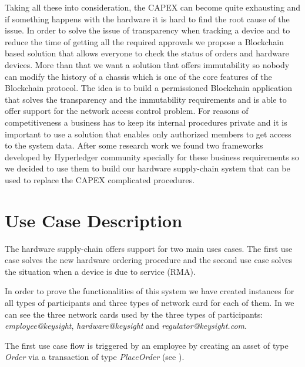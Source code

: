 Taking all these into consideration, the CAPEX can become quite exhausting and if something happens with the hardware it is hard to find the root cause of the issue. In order to solve the issue of transparency when tracking a device and to reduce the time of getting all the required approvals we propose a Blockchain based solution that allows everyone to check the status of orders and hardware devices. More than that we want a solution that offers immutability so nobody can modify the history of a chassis which is one of the core features of the Blockchain protocol.
The idea is to build a permissioned Blockchain application that solves the transparency and the immutability requirements and is able to offer support for the network access control problem.
For reasons of competitiveness a business has to keep its internal procedures private and it is important to use a solution that enables only authorized members to get access to the system data.
After some research work we found two frameworks developed by Hyperledger community specially for these business requirements so we decided to use them to build our hardware supply-chain system that can be used to replace the CAPEX complicated procedures.

\section{Use Case Description}
\label{sub-sec:chapter4-section1}
The hardware supply-chain offers support for two main uses cases. The first use case solves the new hardware ordering procedure and the second use case solves the situation when a device is due to service (RMA).

In order to prove the functionalities of this system we have created instances for all types of participants and three types of network card for each of them. 
In  we can see the three network cards used by the three types of participants: \emph{employee@keysight}, \emph{hardware@keysight} and \emph{regulator@keysight.com}.


The first use case flow is triggered by an employee by creating an asset of type \emph{Order} via a transaction of type \emph{PlaceOrder} (see ). 


